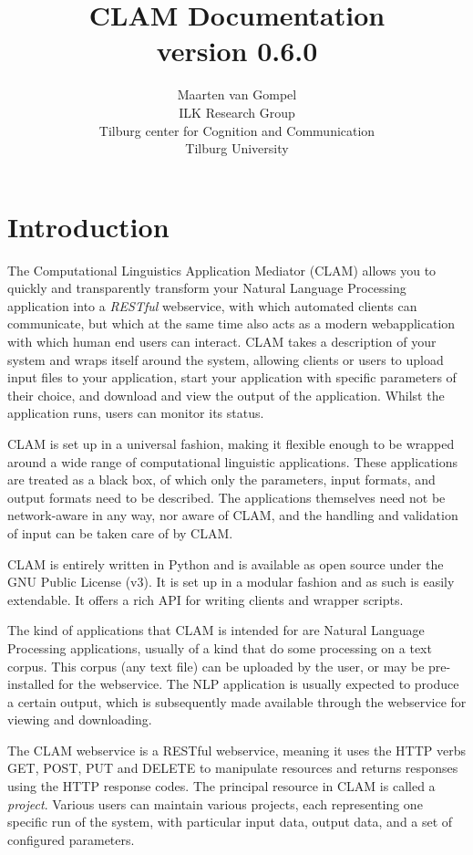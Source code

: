 \documentclass[a4paper,12pt]{report}
\title{CLAM Documentation \\ \small version 0.6.0}
\author{Maarten van Gompel \\ ILK Research Group \\ Tilburg center for Cognition and Communication \\ Tilburg University }
\begin{document}
\sffamily

\maketitle
\tableofcontents

\chapter{Introduction} 

The Computational Linguistics Application Mediator (CLAM) allows you to quickly and transparently transform your Natural Language Processing application into a \emph{RESTful}\/ webservice, with which automated clients can communicate, but which at the same time also acts as a modern webapplication with which human end users can interact. CLAM takes a description of your system and wraps itself around the system, allowing clients or users to upload input files to your application, start your application with specific parameters of their choice, and download and view the output of the application. Whilst the application runs, users can monitor its status.

CLAM is set up in a universal fashion, making it flexible enough to be wrapped around a wide range of computational linguistic applications. These applications are treated as a black box, of which only the parameters, input formats, and output formats need to be described. The applications themselves need not be network-aware in any way, nor aware of CLAM, and the handling and validation of input can be taken care of by CLAM.

CLAM is entirely written in Python and is available as open source under the GNU Public License (v3). It is set up in a modular fashion and as such is easily extendable. It offers a rich API for writing clients and wrapper scripts.

The kind of applications that CLAM is intended for are Natural Language Processing applications, usually of a kind that do some processing on a text corpus. This corpus (any text file) can be uploaded by the user, or may be pre-installed for the webservice. The NLP application is usually expected to produce a certain output, which is subsequently made available through the webservice for viewing and downloading.

The CLAM webservice is a RESTful webservice, meaning it uses the HTTP verbs GET, POST, PUT and DELETE to manipulate resources and returns responses using the HTTP response codes. The principal resource in CLAM is called a \emph{project}. Various users can maintain various projects, each representing one specific run of the system, with particular input data, output data, and a set of configured parameters.
\end{document}
